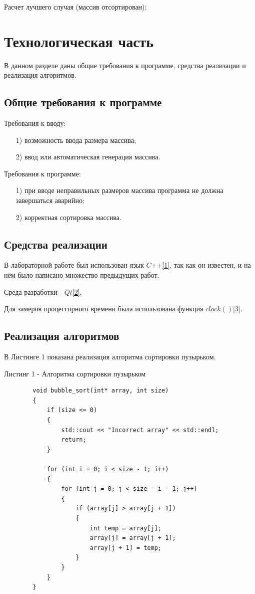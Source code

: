 \documentclass[14pt, a4paper]{extarticle}
\begin{document}
	Расчет лучшего случая (массив отсортирован): 
	
	
	
	
	
	\clearpage
	\section{Технологическая часть}
	В данном разделе даны общие требования к программе, средства реализации и реализация алгоритмов. 
	
	\subsection{Общие требования к программе}
	Требования к вводу:
	\begin{enumerate}
		\item[1)] возможность ввода размера массива;
		\item[2)] ввод или автоматическая генерация массива. 
	\end{enumerate}
	Требования к программе:
	\begin{enumerate}
		\item[1)] при вводе неправильных размеров массива программа не должна завершаться аварийно;
		\item[2)] корректная сортировка массива. 
	\end{enumerate}

	\subsection{Средства реализации}
	В лабораторной работе был использован язык $C$++\hyperref[CPlusPlus]{[1]}, так как он известен, и на нём было написано множество предыдущих работ.
	
	Среда разработки - $Qt$\hyperref[Cute]{[2]}.
	
	Для замеров процессорного времени была использована функция $clock()$\hyperref[CLOCK]{[3]}.
	\newpage
	
	
	
	\subsection{Реализация алгоритмов}
	В Листинге 1 показана реализация алгоритма сортировки пузырьком.
	
	Листинг 1 -	Алгоритма сортировки пузырьком
	\begin{lstlisting}
		void bubble_sort(int* array, int size)
		{
			if (size <= 0)
			{
				std::cout << "Incorrect array" << std::endl;
				return;
			}
			
			for (int i = 0; i < size - 1; i++)
			{
				for (int j = 0; j < size - i - 1; j++)
				{
					if (array[j] > array[j + 1])
					{
						int temp = array[j];
						array[j] = array[j + 1];
						array[j + 1] = temp;
					}
				}
			}
		}
	\end{lstlisting}
	\newpage
	
\end{document}

